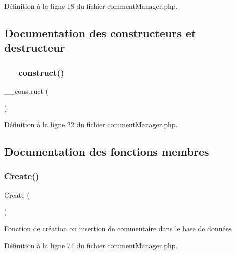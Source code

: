 Définition à la ligne 18 du fichier comment\+Manager.\+php.



\subsection{Documentation des constructeurs et destructeur}
\mbox{\label{class_src_1_1_managers_1_1comment_manager_a095c5d389db211932136b53f25f39685}} 
\subsubsection{\texorpdfstring{\+\_\+\+\_\+construct()}{\_\_construct()}}
{\footnotesize\ttfamily \+\_\+\+\_\+construct (\begin{DoxyParamCaption}{ }\end{DoxyParamCaption})}



Définition à la ligne 22 du fichier comment\+Manager.\+php.



\subsection{Documentation des fonctions membres}
\mbox{\label{class_src_1_1_managers_1_1comment_manager_ad01f71fa0ecc039494e3c282864298c3}} 
\subsubsection{\texorpdfstring{Create()}{Create()}}
{\footnotesize\ttfamily Create (\begin{DoxyParamCaption}{ }\end{DoxyParamCaption})}

Fonction de création ou insertion de commentaire dans le base de données 

Définition à la ligne 74 du fichier comment\+Manager.\+php.

